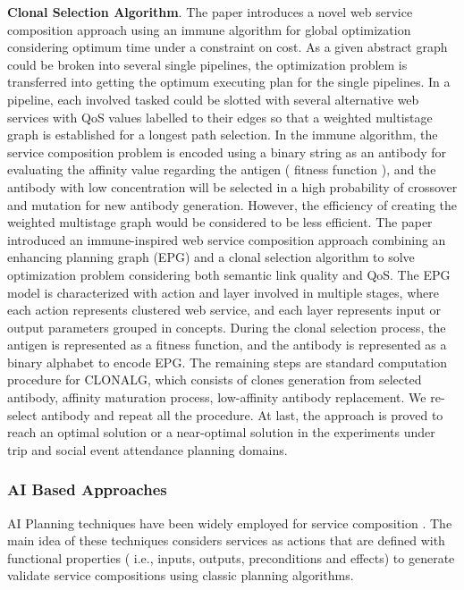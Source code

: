 \textbf{Clonal Selection Algorithm}.
The paper \cite{yan2006immune} introduces a novel web service composition approach using an immune algorithm for global optimization considering optimum time under a constraint on cost. As a given abstract graph could be broken into several single pipelines, the optimization problem is transferred into getting the optimum executing plan for the single pipelines. In a pipeline, each involved tasked could be slotted with several alternative web services with QoS values labelled to their edges so that a weighted multistage graph is established for a longest path selection. In the immune algorithm, the service composition problem is encoded using a binary string as an antibody for evaluating the affinity value regarding the antigen ( fitness function ), and the antibody with low concentration will be selected in a high probability of crossover and mutation for new antibody generation. However, the efficiency of creating the weighted multistage graph would be considered to be less efficient. The paper \cite{pop2009immune} introduced an immune-inspired web service composition approach combining an enhancing planning graph (EPG) and a clonal selection algorithm to solve optimization problem considering both semantic link quality and QoS.  The EPG model is characterized with action and layer involved in multiple stages, where each action represents clustered web service, and each layer represents input or output parameters grouped in concepts.   During the clonal selection process, the antigen is represented as a fitness function, and the antibody is represented as a binary alphabet to encode EPG.  The remaining steps are standard computation procedure for CLONALG, which consists of clones generation from selected antibody, affinity maturation process, low-affinity antibody replacement. We re-select antibody and repeat all the procedure. At last, the approach is proved to reach an optimal solution or a near-optimal solution in the experiments under trip and social event attendance planning domains.

\subsubsection{AI Based Approaches}

AI Planning techniques have been widely employed for service composition \cite{markou2015non,peer2005web}. The main idea of these techniques considers services as actions that are defined with functional properties ( i.e., inputs, outputs, preconditions and effects) to generate validate service compositions using classic planning algorithms. 

